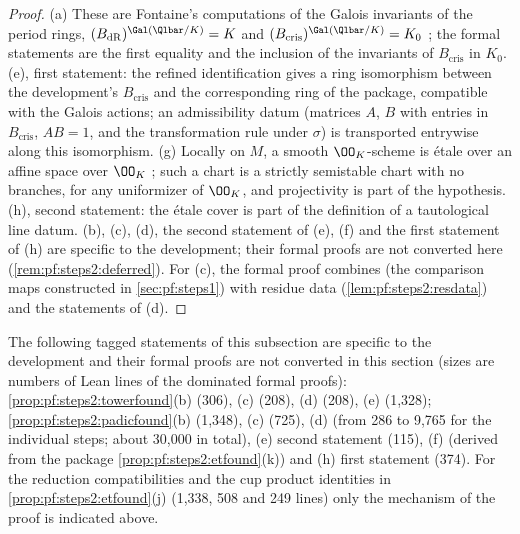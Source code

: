 \begin{proof}
(a) These are Fontaine's computations of the Galois invariants of the period rings,
$(B_{\mathrm{dR}})^{\Gal(\Qlbar/K)}=K$ and $(B_{\mathrm{cris}})^{\Gal(\Qlbar/K)}=K_0$ \cite{Fontaine1994}; the
formal statements are the first equality and the inclusion of the invariants of $B_{\mathrm{cris}}$ in
$K_0$.
(e), first statement: the refined identification gives a ring isomorphism between the development's
$B_{\mathrm{cris}}$ and the corresponding ring of the package, compatible with the Galois actions; an
admissibility datum (matrices $A$, $B$ with entries in $B_{\mathrm{cris}}$, $AB=1$, and the
transformation rule under $\sigma$) is transported entrywise along this isomorphism.
(g) Locally on $M$, a smooth $\OO_K$-scheme is \'etale over an affine space over $\OO_K$
\cite[17.11.4]{Grothendieck1967}; such a chart is a strictly semistable chart with no branches, for any
uniformizer of $\OO_K$, and projectivity is part of the hypothesis.
(h), second statement: the \'etale cover is part of the definition of a tautological line datum.
(b), (c), (d), the second statement of (e), (f) and the first statement of (h) are specific to the
development; their formal proofs are not converted here (\cref{rem:pf:steps2:deferred}). For (c), the
formal proof combines  (the comparison maps
constructed in \cref{sec:pf:steps1}) with residue data (\cref{lem:pf:steps2:resdata}) and the
statements of (d).
\end{proof}

\begin{remark}\label{rem:pf:steps2:deferred}
The following tagged statements of this subsection are specific to the development and their formal
proofs are not converted in this section (sizes are numbers of Lean lines of the dominated formal
proofs): \cref{prop:pf:steps2:towerfound}(b) (306), (c) (208), (d) (208), (e) (1,328);
\cref{prop:pf:steps2:padicfound}(b) (1,348), (c) (725), (d) (from 286 to 9,765 for the individual
steps; about 30,000 in total), (e) second statement (115), (f) (derived from the package
\cref{prop:pf:steps2:etfound}(k)) and (h) first statement (374). For the reduction compatibilities and
the cup product identities in \cref{prop:pf:steps2:etfound}(j) (1,338, 508 and 249 lines) only the
mechanism of the proof is indicated above.
\end{remark}

